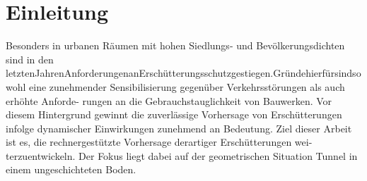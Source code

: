 \chapter{Einleitung}
\label{cha:einleitung}

Besonders in urbanen Räumen mit hohen Siedlungs- und Bevölkerungsdichten sind in den
letztenJahrenAnforderungenanErschütterungsschutzgestiegen.Gründehierfürsindsowohl
eine zunehmender Sensibilisierung gegenüber Verkehrsstörungen als auch erhöhte Anforde-
rungen an die Gebrauchstauglichkeit von Bauwerken. Vor diesem Hintergrund gewinnt die
zuverlässige Vorhersage von Erschütterungen infolge dynamischer Einwirkungen zunehmend
an Bedeutung.
Ziel dieser Arbeit ist es, die rechnergestützte Vorhersage derartiger Erschütterungen wei-
terzuentwickeln. Der Fokus liegt dabei auf der geometrischen Situation Tunnel in einem
ungeschichteten Boden.

